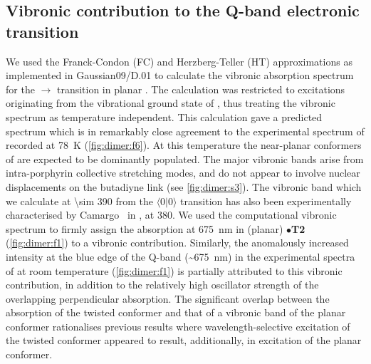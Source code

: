 		\FloatBarrier
	\subsection{Vibronic contribution to the Q-band electronic transition}

		We used the Franck-Condon (FC) and Herzberg-Teller (HT) approximations as implemented in Gaussian09/D.01 to calculate the vibronic absorption spectrum for the $\rightarrow{}$ transition in planar .\autocite{Santoro2008,Barone2009} The calculation was restricted to excitations originating from the vibrational ground state of , thus treating the vibronic spectrum as temperature independent. This calculation gave a predicted spectrum which is in remarkably close agreement to the experimental spectrum of  recorded at \SI{78}{\kelvin} (\autoref{fig:dimer:f6}). At this temperature the near-planar conformers of  are expected to be dominantly populated. The major vibronic bands arise from intra-porphyrin collective stretching modes, and do not appear to involve nuclear displacements on the butadiyne link (see \autoref{fig:dimer:s3}). The vibronic band which we calculate at \SI{\sim 390}{\wn} from the $\langle0|0\rangle$ transition has also been experimentally characterised by Camargo \ in , at \SI{380}{\wn}.\autocite{Camargo2015} We used the computational vibronic spectrum to firmly assign the absorption at \SI{675}{\nano\metre} in (planar) $\bullet$\textbf{T2} (\autoref{fig:dimer:f1}) to a vibronic contribution. Similarly, the anomalously increased intensity at the blue edge of the Q-band (\textasciitilde{}\SI{675}{\nano\metre}) in the experimental spectra of  at room temperature (\autoref{fig:dimer:f1}) is partially attributed to this vibronic contribution, in addition to the relatively high oscillator strength of the overlapping perpendicular absorption. The significant overlap between the absorption of the twisted conformer and that of a vibronic band of the planar conformer rationalises previous results where wavelength-selective excitation of the twisted conformer appeared to result, additionally, in excitation of the planar conformer.\autocite{Winters2007,Wilkinson2014} 

